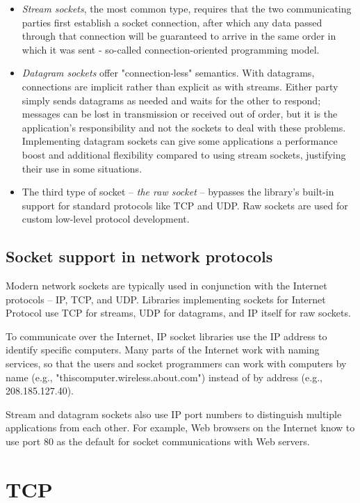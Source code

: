 \documentclass[a4paper,12pt]{article}
\begin{document}
\begin{itemize}
    \item \textit{Stream sockets}, the most common type, requires that the two communicating parties first establish a socket connection, after which any data passed through that connection will be guaranteed to arrive in the same order in which it was sent - so-called connection-oriented programming model.
    \item \textit{Datagram sockets} offer "connection-less" semantics. With datagrams, connections are implicit rather than explicit as with streams. Either party simply sends datagrams as needed and waits for the other to respond; messages can be lost in transmission or received out of order, but it is the application's responsibility and not the sockets to deal with these problems. Implementing datagram sockets can give some applications a performance boost and additional flexibility compared to using stream sockets, justifying their use in some situations.
    \item The third type of socket -- \textit{the raw socket} -- bypasses the library's built-in support for standard protocols like TCP and UDP. Raw sockets are used for custom low-level protocol development.
\end{itemize}

\subsection{Socket support in network protocols}
Modern network sockets are typically used in conjunction with the Internet protocols -- IP, TCP, and UDP. Libraries implementing sockets for Internet Protocol use TCP for streams, UDP for datagrams, and IP itself for raw sockets.


To communicate over the Internet, IP socket libraries use the IP address to identify specific computers. Many parts of the Internet work with naming services, so that the users and socket programmers can work with computers by name (e.g., "thiscomputer.wireless.about.com") instead of by address (e.g., 208.185.127.40).


Stream and datagram sockets also use IP port numbers to distinguish multiple applications from each other. For example, Web browsers on the Internet know to use port 80 as the default for socket communications with Web servers.


\section{TCP}

\subsection{}
\end{document}
